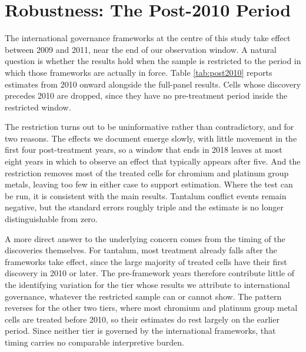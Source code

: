 \documentclass[11pt]{article}
\begin{document}

\section{Robustness: The Post-2010 Period}
\label{sec:post2010}

The international governance frameworks at the centre of this study take effect between 2009 and 2011, near the end of our observation window. A natural question is whether the results hold when the sample is restricted to the period in which those frameworks are actually in force. Table \ref{tab:post2010} reports estimates from 2010 onward alongside the full-panel results. Cells whose discovery precedes 2010 are dropped, since they have no pre-treatment period inside the restricted window.

The restriction turns out to be uninformative rather than contradictory, and for two reasons. The effects we document emerge slowly, with little movement in the first four post-treatment years, so a window that ends in 2018 leaves at most eight years in which to observe an effect that typically appears after five. And the restriction removes most of the treated cells for chromium and platinum group metals, leaving too few in either case to support estimation. Where the test can be run, it is consistent with the main results. Tantalum conflict events remain negative, but the standard errors roughly triple and the estimate is no longer distinguishable from zero.

A more direct answer to the underlying concern comes from the timing of the discoveries themselves. For tantalum, most treatment already falls after the frameworks take effect, since the large majority of treated cells have their first discovery in 2010 or later. The pre-framework years therefore contribute little of the identifying variation for the tier whose results we attribute to international governance, whatever the restricted sample can or cannot show. The pattern reverses for the other two tiers, where most chromium and platinum group metal cells are treated before 2010, so their estimates do rest largely on the earlier period. Since neither tier is governed by the international frameworks, that timing carries no comparable interpretive burden.
\end{document}
